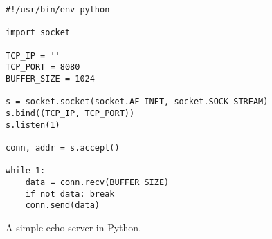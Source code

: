 \begin{listing}[htpb]
    \begin{verbatim}
#!/usr/bin/env python

import socket

TCP_IP = ''
TCP_PORT = 8080
BUFFER_SIZE = 1024

s = socket.socket(socket.AF_INET, socket.SOCK_STREAM)
s.bind((TCP_IP, TCP_PORT))
s.listen(1)

conn, addr = s.accept()

while 1:
    data = conn.recv(BUFFER_SIZE)
    if not data: break
    conn.send(data)
    \end{verbatim}
    \caption{A simple echo server in Python.}
    \label{fig:server-test-code}
\end{listing}
